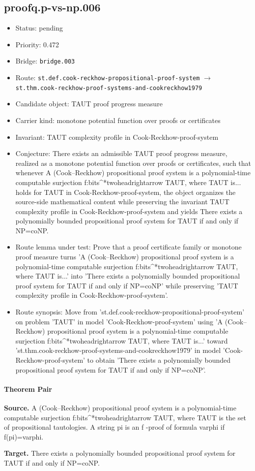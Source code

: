 \documentclass[11pt]{article}
\begin{document}
\subsection*{proofq.p-vs-np.006}
\begin{itemize}[leftmargin=*,itemsep=0.25em]
\item Status: pending
\item Priority: 0.472
\item Bridge: \texttt{bridge.003}
\item Route: \texttt{st.def.cook-reckhow-propositional-proof-system} $\rightarrow$ \texttt{st.thm.cook-reckhow-proof-systems-and-cookreckhow1979}
\item Candidate object: TAUT proof progress measure
\item Carrier kind: monotone potential function over proofs or certificates
\item Invariant: TAUT complexity profile in Cook-Reckhow-proof-system
\item Conjecture: There exists an admissible TAUT proof progress measure, realized as a monotone potential function over proofs or certificates, such that whenever A (Cook--Reckhow) propositional proof system is a polynomial-time computable surjection f:bits\textasciicircum{}*twoheadrightarrow TAUT, where TAUT is... holds for TAUT in Cook-Reckhow-proof-system, the object organizes the source-side mathematical content while preserving the invariant TAUT complexity profile in Cook-Reckhow-proof-system and yields There exists a polynomially bounded propositional proof system for TAUT if and only if NP=coNP.
\item Route lemma under test: Prove that a proof certificate family or monotone proof measure turns 'A (Cook--Reckhow) propositional proof system is a polynomial-time computable surjection f:bits\textasciicircum{}*twoheadrightarrow TAUT, where TAUT is...' into 'There exists a polynomially bounded propositional proof system for TAUT if and only if NP=coNP' while preserving 'TAUT complexity profile in Cook-Reckhow-proof-system'.
\item Route synopsis: Move from 'st.def.cook-reckhow-propositional-proof-system' on problem 'TAUT' in model 'Cook-Reckhow-proof-system' using 'A (Cook--Reckhow) propositional proof system is a polynomial-time computable surjection f:bits\textasciicircum{}*twoheadrightarrow TAUT, where TAUT is...' toward 'st.thm.cook-reckhow-proof-systems-and-cookreckhow1979' in model 'Cook-Reckhow-proof-system' to obtain 'There exists a polynomially bounded propositional proof system for TAUT if and only if NP=coNP'.
\end{itemize}
\paragraph{Theorem Pair}
\textbf{Source.} A (Cook--Reckhow) propositional proof system is a polynomial-time computable surjection f:bits\textasciicircum{}*twoheadrightarrow TAUT, where TAUT is the set of propositional tautologies. A string pi is an f -proof of formula varphi if f(pi)=varphi.

\textbf{Target.} There exists a polynomially bounded propositional proof system for TAUT if and only if NP=coNP.
\end{document}
